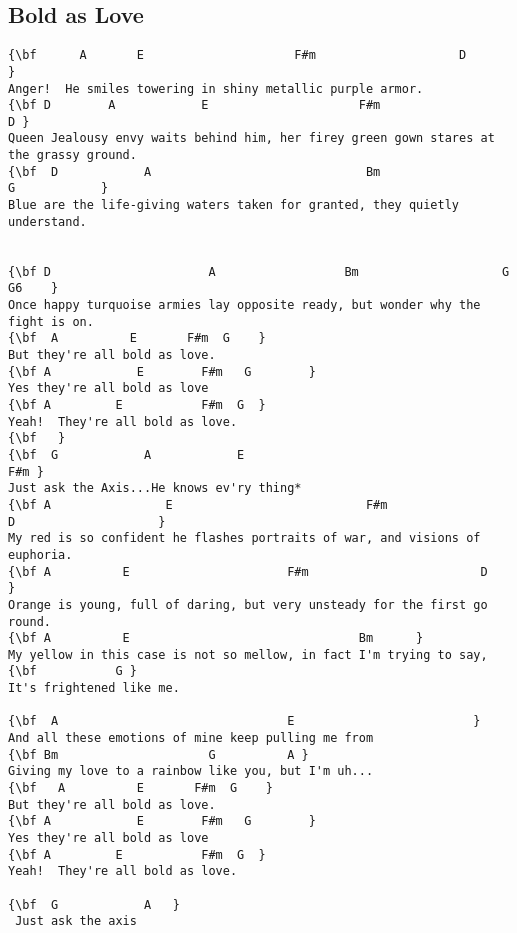 \documentclass[a4paper]{article}
\begin{document}
\subsection{Bold as Love}
\begin{Verbatim}[commandchars=\\\{\}]
{\bf 	  A       E                     F#m                    D                    }
Anger!  He smiles towering in shiny metallic purple armor.   
{\bf D        A            E                     F#m                   D }
Queen Jealousy envy waits behind him, her firey green gown stares at the grassy ground.   
{\bf  D            A                              Bm                    G            }
Blue are the life-giving waters taken for granted, they quietly understand. 


{\bf D                      A                  Bm                    G    G6    }
Once happy turquoise armies lay opposite ready, but wonder why the fight is on. 
{\bf  A          E       F#m  G    }
But they're all bold as love. 
{\bf A            E        F#m   G        }
Yes they're all bold as love 
{\bf A         E           F#m  G  }
Yeah!  They're all bold as love. 
{\bf   }
{\bf  G            A            E                                          F#m }
Just ask the Axis...He knows ev'ry thing* 
{\bf A                E                           F#m                    D                    }
My red is so confident he flashes portraits of war, and visions of euphoria.   
{\bf A          E                      F#m                        D                    }
Orange is young, full of daring, but very unsteady for the first go round. 
{\bf A          E                                Bm      }
My yellow in this case is not so mellow, in fact I'm trying to say,  
{\bf           G }
It's frightened like me. 

{\bf  A                                E                         }
And all these emotions of mine keep pulling me from  
{\bf Bm                     G          A }
Giving my love to a rainbow like you, but I'm uh... 
{\bf   A          E       F#m  G    }
But they're all bold as love. 
{\bf A            E        F#m   G        }
Yes they're all bold as love 
{\bf A         E           F#m  G  }
Yeah!  They're all bold as love. 

{\bf  G            A   }
 Just ask the axis

\end{Verbatim}
\newpage
\end{document}
